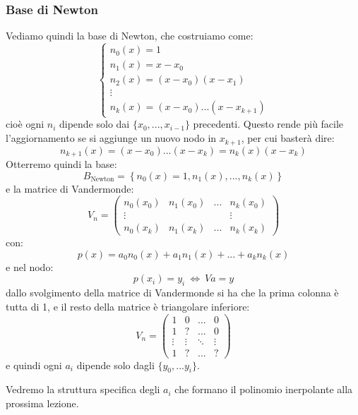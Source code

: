 \documentclass[a4paper,11pt]{article}
\begin{document}
\subsubsection{Base di Newton}
Vediamo quindi la base di Newton, che costruiamo come:
\[
	\begin{cases}
			n_0(x) = 1 \\
			n_1(x) = x - x_0 \\
			n_2(x) = (x - x_0)(x - x_1) \\
			\vdots \\
			n_k(x) = (x - x_0) ... (x - x_{k + 1})
	\end{cases}
\]
cioè ogni $n_i$ dipende solo dai $\{ x_0, ..., x_{i - 1} \}$ precedenti.
Questo rende più facile l'aggiornamento se si aggiunge un nuovo nodo in $x_{k + 1}$, per cui basterà dire:
$$
n_{k + 1}(x) = (x - x_0) ... (x - x_k) = n_k(x) (x - x_k)
$$
Otterremo quindi la base:
$$
B_\text{Newton} = \left\{ n_0(x) = 1, n_1(x), ..., n_k(x) \right\}
$$
e la matrice di Vandermonde:
$$
V_n =
\begin{pmatrix}
	n_0(x_0) & n_1(x_0) & ... & n_k(x_0) \\ 
	\vdots & & & \vdots \\
	n_0(x_k) & n_1(x_k) & ... & n_k(x_k)
\end{pmatrix}
$$
con:
$$
p(x) = a_0 n_0(x) + a_1 n_1(x) + ... + a_k n_k(x)
$$
e nel nodo:
$$
p(x_i) = y_i \ \Leftrightarrow \ Va = y
$$
dallo svolgimento della matrice di Vandermonde si ha che la prima colonna è tutta di 1, e il resto della matrice è triangolare inferiore:
$$
V_n =
\begin{pmatrix}
	1 & 0 & ... & 0 \\
	1 & ? & ... & 0 \\
	\vdots & \vdots & \ddots & \vdots \\
	1 & ? & ... & ?
\end{pmatrix}
$$
e quindi ogni $a_i$ dipende solo dagli $\{ y_0, ... y_i \}$.

Vedremo la struttura specifica degli $a_i$ che formano il polinomio inerpolante alla prossima lezione.
\end{document}
